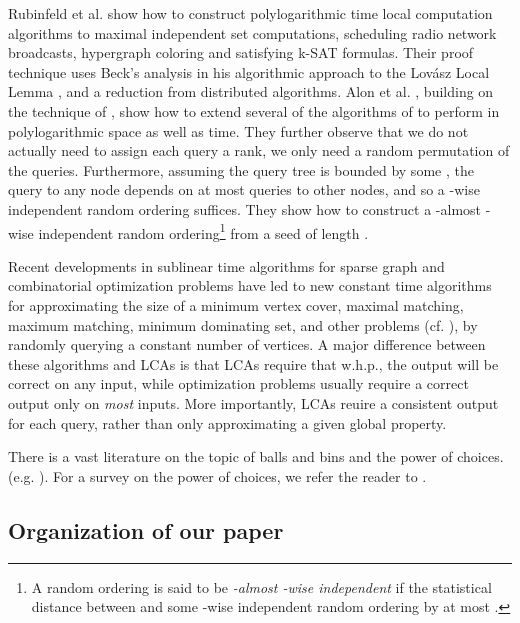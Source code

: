 \documentclass[english, oribibl]{llncs}
\begin{document}
Rubinfeld et al. \cite{RTVX11} show how to construct polylogarithmic time local computation algorithms to maximal independent set computations, scheduling radio network broadcasts, hypergraph coloring and satisfying k-SAT formulas. Their proof technique uses Beck's analysis in
his algorithmic approach to the Lov{\'{a}}sz Local Lemma \cite{Bec91}, and a reduction from distributed algorithms. 
Alon et al. \cite{ARV+11}, building on the technique of \cite{NO08}, show how to extend several of the algorithms of \cite{RTVX11} to perform in polylogarithmic space as well as time. They further observe that we do not actually need to assign each query  a rank, we only need a random permutation of the queries. Furthermore, assuming the query tree is bounded by some , the query to any node depends on at most  queries to other nodes, and so a -wise independent random ordering suffices. They show  how to construct a -almost -wise independent random ordering\footnote{A random ordering  is said to be \emph{-almost -wise independent} if the statistical distance between  and some -wise independent random ordering by at most .} from a seed of length . 





Recent developments in sublinear time algorithms for sparse graph and
combinatorial optimization problems have led to new constant time
algorithms for approximating the size of a minimum vertex cover, maximal matching, 
maximum matching, minimum dominating set, and other problems (cf. \cite{PR07, MR06, NO08, YYI09}), by 
randomly querying a constant number of vertices.
A major difference between these algorithms and LCAs is that LCAs require that w.h.p., the 
output will be correct on any input, while optimization problems usually require a correct output only on \emph{most} inputs. More importantly, LCAs reuire a consistent output for each query, rather than only approximating a given global property.

There is a vast literature on the topic of balls and bins and the power of  choices. (e.g. \cite{ABK+99, BCS+06, DR96, TW07}). For a survey on the power of  choices, we refer the reader to \cite{MRR01}.





\subsection{Organization of our paper}
\end{document}

